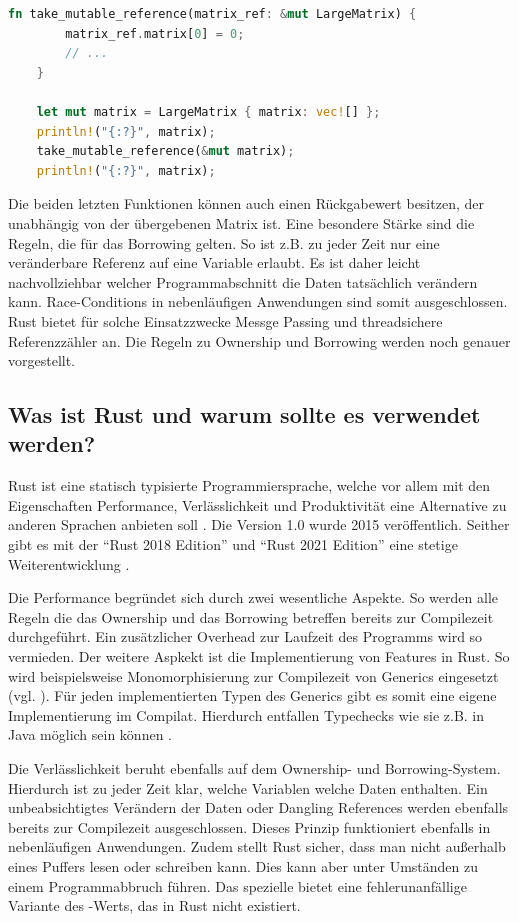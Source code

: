 \documentclass[11pt,a4paper, ngerman]{article}
\begin{document}
\begin{lstlisting}[language=rust, caption={Einführendes Beispiel: Veränderliche Referenz}]
    fn take_mutable_reference(matrix_ref: &mut LargeMatrix) {
        matrix_ref.matrix[0] = 0;
        // ...
    }

    let mut matrix = LargeMatrix { matrix: vec![] };
    println!("{:?}", matrix);
    take_mutable_reference(&mut matrix);
    println!("{:?}", matrix);
\end{lstlisting}

Die beiden letzten Funktionen können auch einen Rückgabewert besitzen, der unabhängig von der übergebenen Matrix ist. Eine besondere Stärke sind die Regeln, die für das Borrowing gelten. So ist z.B. zu jeder Zeit nur eine veränderbare Referenz auf eine Variable erlaubt. Es ist daher leicht nachvollziehbar welcher Programmabschnitt die Daten tatsächlich verändern kann. Race-Conditions in nebenläufigen Anwendungen sind somit ausgeschlossen. Rust bietet für solche Einsatzzwecke Messge Passing \cite{K1727} und threadsichere Referenzzähler \cite{ArcSrc} an. Die Regeln zu Ownership und Borrowing werden noch genauer vorgestellt.

\label{sec:kap3d2}
\subsection{Was ist Rust und warum sollte es verwendet werden?}
Rust ist eine statisch typisierte Programmiersprache, welche vor allem mit den Eigenschaften Performance, Verlässlichkeit und Produktivität eine Alternative zu anderen Sprachen anbieten soll \cite{RustPromises}. Die Version 1.0 wurde 2015 veröffentlich. Seither gibt es mit der ``Rust 2018 Edition'' und ``Rust 2021 Edition'' eine stetige Weiterentwicklung \cite{RustEditions}.

Die Performance begründet sich durch zwei wesentliche Aspekte. So werden alle Regeln die das Ownership und das Borrowing betreffen bereits zur Compilezeit durchgeführt. Ein zusätzlicher Overhead zur Laufzeit des Programms wird so vermieden. Der weitere Aspkekt ist die Implementierung von Features in Rust. So wird beispielsweise Monomorphisierung zur Compilezeit von Generics eingesetzt (vgl. \cite[S. 196 ff.]{SK19}). Für jeden implementierten Typen des Generics gibt es somit eine eigene Implementierung im Compilat. Hierdurch entfallen Typechecks wie sie z.B. in Java möglich sein können \cite{JavaGenerics}.

Die Verlässlichkeit beruht ebenfalls auf dem Ownership- und Borrowing-System. Hierdurch ist zu jeder Zeit klar, welche Variablen welche Daten enthalten. Ein unbeabsichtigtes Verändern der Daten oder Dangling References werden ebenfalls bereits zur Compilezeit ausgeschlossen. Dieses Prinzip funktioniert ebenfalls in nebenläufigen Anwendungen. Zudem stellt Rust sicher, dass man nicht außerhalb eines Puffers lesen oder schreiben kann. Dies kann aber unter Umständen zu einem Programmabbruch führen. Das spezielle   bietet eine fehlerunanfällige Variante des -Werts, das in Rust nicht existiert.
\end{document}
